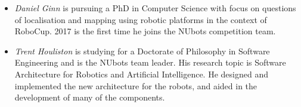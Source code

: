 \documentclass{llncs}
\begin{document}
\begin{itemize}
\item \emph{Daniel Ginn} is pursuing a PhD in Computer Science with focus on questions of localisation and mapping using robotic platforms in the context of RoboCup. 2017 is the first time he joins the NUbots competition team.

\item \emph{Trent Houliston} is studying for a Doctorate of Philosophy in Software Engineering and is the NUbots team leader. His research topic is Software Architecture for Robotics and Artificial Intelligence. He designed and implemented the new architecture for the robots, and aided in the development of many of the components.











\end{itemize}
\end{document}
